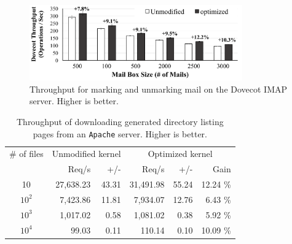 \begin{figure}
\scriptsize
\centering
\includegraphics[width=3.6in]{dcache/plots/dovecot.pdf}
\vspace{-5pt}
\caption[Throughput of the Dovecot IMAP server]
{Throughput for marking and unmarking mail on the Dovecot IMAP server. Higher is better. }
\label{fig:dcache:dovecot}
\vspace{-10pt}
\end{figure}

\begin{table}[t]
\scriptsize
\centering
\begin{tabular}{|c|rr|rrr|}
\hline
\# of files & \multicolumn{2}{c|}{Unmodified kernel} & \multicolumn{3}{c|}{Optimized kernel} \\
& Req/s & +/- & Req/s & +/- & Gain\\
\hline
    10 &     27,638.23 & 43.31 & 31,491.98 & 55.24 & 12.24 \% \\
\hline
$10^2$ &      7,423.86 & 11.81 &  7,934.07 & 12.76 &  6.43 \% \\
\hline
$10^3$ &      1,017.02 &  0.58 &  1,081.02 &  0.38 &  5.92 \% \\
\hline
$10^4$ &         99.03 &  0.11 &    110.14 &  0.10 & 10.09 \% \\
\hline
\end{tabular}
\caption{Throughput of downloading generated directory listing pages from an {\tt Apache} server. Higher is better.}
\label{tab:dcache:apache}
\vspace{-10pt}
\end{table}

